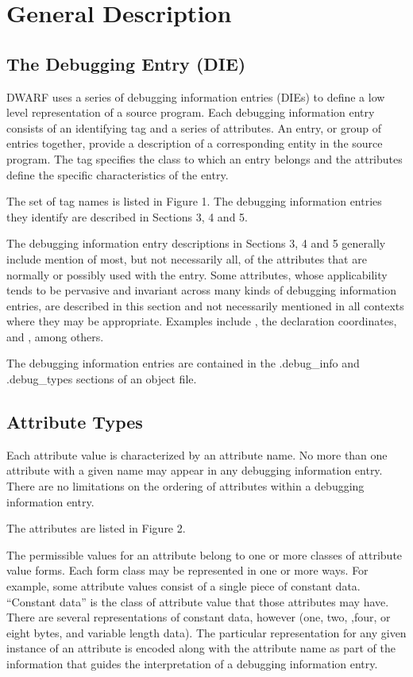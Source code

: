 \chapter{General Description}
\label{chap:generaldescription}
\section{The Debugging Entry (DIE)}
\label{chap:thedebuggingentrydie}
DWARF uses a series of debugging information entries (DIEs) to 
define a low\dash{} level
representation of a source program. 
Each debugging information entry consists of an identifying
tag and a series of attributes. 
An entry, or group of entries together, provide a description of a
corresponding entity in the source program. 
The tag specifies the class to which an entry belongs
and the attributes define the specific characteristics of the entry.

The set of tag names is listed in Figure 1. 
The debugging information entries they identify are
described in Sections 3, 4 and 5.

The debugging information entry descriptions 
in Sections 3, 4 and 5 generally include mention of
most, but not necessarily all, of the attributes 
that are normally or possibly used with the entry.
Some attributes, whose applicability tends to be 
pervasive and invariant across many kinds of
debugging information entries, are described in 
this section and not necessarily mentioned in all
contexts where they may be appropriate. 
Examples include , the declaration
coordinates, and , among others.

The debugging information entries are contained 
in the .debug\_info and .debug\_types
sections of an object file.



\section{Attribute Types}
\label{chap:attributetypes}
Each attribute value is characterized by an attribute name. 
No more than one attribute with a given name may appear in any
debugging information entry. 
There are no limitations on the
ordering of attributes within a debugging information entry.

The attributes are listed in Figure 2.  

The permissible values
for an attribute belong to one or more classes of attribute
value forms.  
Each form class may be represented in one or more ways. 
For example, some attribute values consist
of a single piece of constant data. 
``Constant data''
is the class of attribute value that those attributes may have. 
There are several representations of constant data,
however (one, two, ,four, or eight bytes, and variable length
data). 
The particular representation for any given instance
of an attribute is encoded along with the attribute name as
part of the information that guides the interpretation of a
debugging information entry.  

